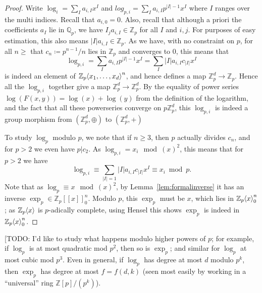 \documentclass{article}
\newcommand{\Z}{\mathbb{Z}}
\newcommand{\Q}{\mathbb{Q}}
\renewcommand{\angle}[1]{\hspace{-2pt}\left\langle #1 \right\rangle}
\theoremstyle{plain}
\theoremstyle{definition}
\theoremstyle{remark}
\begin{document}
\begin{proof}
Write $\log_{i} = \sum_{I} a_{i,I} x^I$ and $log_{p,i} = \sum_I a_{i,I} p^{|I|-1} x^I$ where $I$ ranges over the multi indices. Recall that $a_{i,0} = 0$. Also, recall that although a priori the coefficients $a_I$ lie in $\Q_p$, we have $I_j a_{i,I} \in \Z_p$ for all $I$ and $i,j$. For purposes of easy estimation, this also means $|I|a_{i,I} \in \Z_p$. As we have, with no constraint on $p$, for all $n\geq $ that $c_n\coloneqq p^{n-1}/n$ lies in $\Z_p$ and converges to $0$, this means that \[ \log_{p,i} = \sum_I a_{i,I} p^{|I|-1} x^I = \sum_I |I|a_{i,I} c_{|I|} x^I\] is indeed an element of $\Z_p\angle{x_1,\dots,x_d}^n$, and hence defines a map $\Z_p^d \to \Z_p$. Hence all the $\log_{p,i}$ together give a map $\Z_p^d \to \Z_p^d$. By the equality of power series $\log(F(x,y)) = \log(x)+\log(y)$ from the definition of the logarithm, and the fact that all these powerseries converge on $p\Z_p^d$, this $\log_{p,i}$ is indeed a group morphism from $(\Z_p^d,\oplus)$ to $(\Z_p^d,+)$

To study $\log_p$ modulo $p$, we note that if $n\geq 3$, then $p$ actually divides $c_n$, and for $p > 2$ we even have $p|c_2$. As $\log_{p,i} = x_i \mod (x)^2$, this means that for $p > 2$ we have \[\log_{p,i} \equiv \sum_{|I| = 1} |I|a_{i,I}c_|I| x^I \equiv x_i \bmod p.\]
Note that as $\log_p \equiv x \mod (x)^2$, by Lemma~\ref{lem:formalinverse} it has an inverse $\exp_p \in \Z_p[[x]]_0^n$. Modulo $p$, this $\exp_p$ must be $x$, which lies in $\Z_p\angle{x}_0^n$; as $\Z_p\angle{x}$ is $p$-adically complete, using Hensel this shows $\exp_p$ is indeed in $\Z_p\angle{x}_0^n$.
\end{proof}
[TODO: I'd like to study what happens modulo higher powers of $p$; for example, if $\log_p$ is at most quadratic mod $p^2$, then so is $\exp_p$; and similar for $\log_p$ at most cubic mod $p^3$. Even in general, if $\log_p$ has degree at most $d$ modulo $p^k$, then $\exp_p$ has degree at most $f = f(d,k)$ (seen most easily by working in a ``universal'' ring $\Z[p]/(p^k)$).
\end{document}

